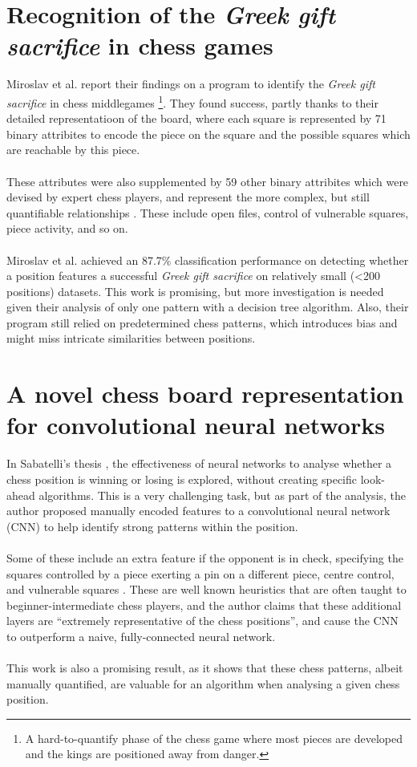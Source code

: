 \section{Recognition of the \emph{Greek gift sacrifice} in  chess games}
Miroslav et al. report their findings on a program \cite{middlegamePatterns}
to identify the \emph{Greek gift sacrifice} in chess middlegames
\footnote{A hard-to-quantify phase of the chess game where
most pieces are developed and the kings are positioned away from danger.}. They
found success, partly thanks to their detailed representatioon of the board, where
each square is represented by 71 binary attribites \cite{middlegamePatterns} to
encode the piece on the square and the possible squares which are reachable by
this piece. 
\\~\\
These attributes were also supplemented by 59 other binary attribites which were
devised by expert chess players, and represent the more complex, but still
quantifiable relationships \cite{middlegamePatterns}. These include open files,
control of vulnerable squares, piece activity, and so on.
\\~\\
Miroslav et al. achieved an 87.7\% classification performance on detecting whether
a position features a successful \emph{Greek gift sacrifice} on relatively 
small (<200 positions) datasets. This work is promising, but more investigation
is needed given their analysis of only one pattern with a decision tree algorithm.
Also, their program still relied on predetermined chess patterns, which introduces
bias and might miss intricate similarities between positions.

\section{A novel chess board representation for convolutional neural networks}
In Sabatelli's thesis \cite{chessCNN}, the effectiveness of neural networks to analyse whether
a chess position is winning or losing is explored, without creating specific
look-ahead algorithms. This is a very challenging task, but as part of the analysis,
the author proposed manually encoded features to a convolutional neural network (CNN)
to help identify strong patterns within the position. 
\\~\\
Some of these include an extra feature if the opponent is in check, specifying
the squares controlled by a piece exerting a pin on a different piece, centre
control, and vulnerable squares \cite{chessCNN}. These are well known heuristics that are often
taught to beginner-intermediate chess players, and the author claims that these
additional layers are ``extremely representative of the chess positions'', and
cause the CNN to outperform a naive, fully-connected neural network.
\\~\\
This work is also a promising result, as it shows that these chess patterns,
albeit manually quantified, are valuable for an algorithm when analysing a given
chess position.

